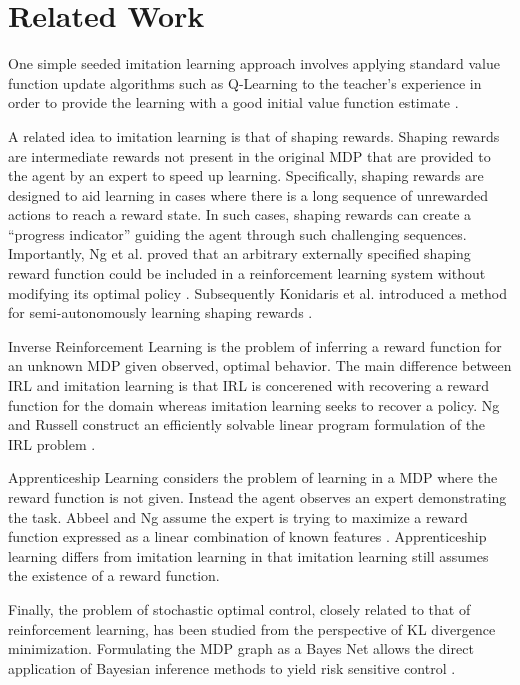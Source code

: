 \documentclass{article} %
\begin{document}
\section{Related Work}
One simple seeded imitation learning approach involves applying standard value function update algorithms such as Q-Learning to the teacher's experience in order to provide the learning with a good initial value function estimate \cite{whitehead91,price01}. 

A related idea to imitation learning is that of shaping rewards. Shaping rewards are intermediate rewards not present in the original MDP that are provided to the agent by an expert to speed up learning. Specifically, shaping rewards are designed to aid learning in cases where there is a long sequence of unrewarded actions to reach a reward state. In such cases, shaping rewards can create a ``progress indicator'' guiding the agent through such challenging sequences. Importantly, Ng et al. proved that an arbitrary externally specified shaping reward function could be included in a reinforcement learning system without modifying its optimal policy \cite{ng99}. Subsequently Konidaris et al. introduced a method for semi-autonomously learning shaping rewards \cite{konidaris06}.

Inverse Reinforcement Learning is the problem of inferring a reward function for an unknown MDP given observed, optimal behavior. The main difference between IRL and imitation learning is that IRL is concerened with recovering a reward function for the domain whereas imitation learning seeks to recover a policy. Ng and Russell construct an efficiently solvable linear program formulation of the IRL problem \cite{ng00}. 

Apprenticeship Learning considers the problem of learning in a MDP where the reward function is not given. Instead the agent observes an expert demonstrating the task. Abbeel and Ng assume the expert is trying to maximize a reward function expressed as a linear combination of known features \cite{abbeel04}. Apprenticeship learning differs from imitation learning in that imitation learning still assumes the existence of a reward function.

Finally, the problem of stochastic optimal control, closely related to that of reinforcement learning, has been studied from the perspective of KL divergence minimization. Formulating the MDP graph as a Bayes Net allows the direct application of Bayesian inference methods to yield risk sensitive control \cite{rawlik10,tousaint06}.
\end{document}
